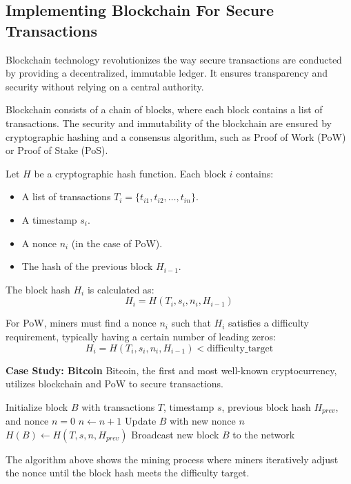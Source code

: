 \documentclass[12pt]{book} %
\begin{document}
\subsection{Implementing Blockchain For Secure Transactions}
Blockchain technology revolutionizes the way secure transactions are conducted by providing a decentralized, immutable ledger. It ensures transparency and security without relying on a central authority.

Blockchain consists of a chain of blocks, where each block contains a list of transactions. The security and immutability of the blockchain are ensured by cryptographic hashing and a consensus algorithm, such as Proof of Work (PoW) or Proof of Stake (PoS).

Let $H$ be a cryptographic hash function. Each block $i$ contains:
\begin{itemize}
    \item A list of transactions $T_i = \{t_{i1}, t_{i2}, \ldots, t_{in}\}$.
    \item A timestamp $s_i$.
    \item A nonce $n_i$ (in the case of PoW).
    \item The hash of the previous block $H_{i-1}$.
\end{itemize}

The block hash $H_i$ is calculated as:
\[
H_i = H(T_i, s_i, n_i, H_{i-1})
\]

For PoW, miners must find a nonce $n_i$ such that $H_i$ satisfies a difficulty requirement, typically having a certain number of leading zeros:
\[
H_i = H(T_i, s_i, n_i, H_{i-1}) < \text{difficulty\_target}
\]

\textbf{Case Study: Bitcoin}
Bitcoin, the first and most well-known cryptocurrency, utilizes blockchain and PoW to secure transactions.
\FloatBarrier
\begin{algorithm}
\caption{Bitcoin Mining Process}
\begin{algorithmic}[1]
\State Initialize block $B$ with transactions $T$, timestamp $s$, previous block hash $H_{prev}$, and nonce $n = 0$
    \State $n \gets n + 1$
    \State Update $B$ with new nonce $n$
    \State $H(B) \gets H(T, s, n, H_{prev})$
\EndWhile
\State Broadcast new block $B$ to the network
\end{algorithmic}
\end{algorithm}
\FloatBarrier

The algorithm above shows the mining process where miners iteratively adjust the nonce until the block hash meets the difficulty target.
\end{document}
